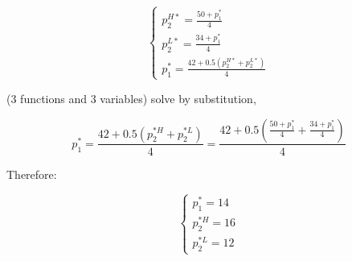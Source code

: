 \documentclass{article}
\begin{document}
\begin{equation}
    \begin{cases}
p^{H*}_2 = \frac{50+p^{*}_1}{4} \\
p^{L*}_2 = \frac{34+p^{*}_1}{4} \\
p^{*}_1 = \frac{42 + 0.5(p^{H*}_2 + p^{L*}_2)}{4}
    \end{cases}
\nonumber
\end{equation}

(3 functions and 3 variables) solve by substitution,

$$p^{*}_1 = \frac{42 + 0.5(p^{*H}_2 + p^{*L}_2)}{4}= \frac{42 + 0.5(\frac{50+p^{*}_1}{4} + \frac{34+p^{*}_1}{4})}{4} $$

Therefore: 

\begin{equation}
    \begin{cases}
p^*_1 = 14 \\ p^{*H}_2 = 16 \\ p^{*L}_2 =12
    \end{cases}
\nonumber
\end{equation}
\end{document}
